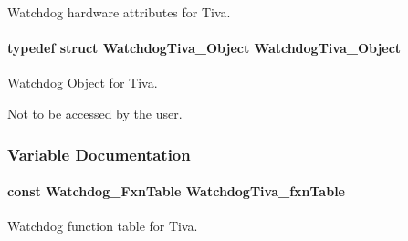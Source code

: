Watchdog hardware attributes for Tiva. 

\paragraph[{Watchdog\-Tiva\-\_\-\-Object}]{\setlength{\rightskip}{0pt plus 5cm}typedef struct {\bf Watchdog\-Tiva\-\_\-\-Object}  {\bf Watchdog\-Tiva\-\_\-\-Object}}\label{_watchdog_tiva_8h_a59414cac1ebd2580c3475ac6d7f24342}


Watchdog Object for Tiva. 

Not to be accessed by the user. 

\subsubsection{Variable Documentation}
\paragraph[{Watchdog\-Tiva\-\_\-fxn\-Table}]{\setlength{\rightskip}{0pt plus 5cm}const {\bf Watchdog\-\_\-\-Fxn\-Table} Watchdog\-Tiva\-\_\-fxn\-Table}\label{_watchdog_tiva_8h_ae03e6ed51cc78abdf88691959865c2e2}


Watchdog function table for Tiva. 

